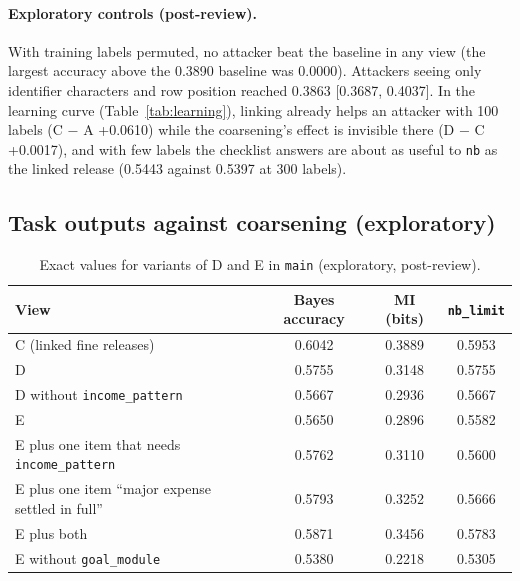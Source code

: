 \documentclass[11pt]{article}
\newcommand{\code}[1]{\texttt{#1}}
\begin{document}
\paragraph{Exploratory controls (post-review).} With training labels permuted, no attacker beat the baseline in any view (the largest accuracy above the 0.3890 baseline was 0.0000). Attackers seeing only identifier characters and row position reached 0.3863 [0.3687, 0.4037]. In the learning curve (Table~\ref{tab:learning}), linking already helps an attacker with 100 labels (C $-$ A +0.0610) while the coarsening's effect is invisible there (D $-$ C +0.0017), and with few labels the checklist answers are about as useful to \code{nb} as the linked release (0.5443 against 0.5397 at 300 labels).

\subsection{Task outputs against coarsening (exploratory)}
\label{sec:evsd}

\begin{table}[htbp]
\centering\footnotesize
\caption{Exact values for variants of D and E in \code{main} (exploratory, post-review).}
\label{tab:variants}
\begin{tabular}{@{}lccc@{}}
\toprule
View & Bayes accuracy & MI (bits) & \code{nb\_limit} \\
\midrule
C (linked fine releases) & 0.6042 & 0.3889 & 0.5953 \\
D & 0.5755 & 0.3148 & 0.5755 \\
D without \code{income\_pattern} & 0.5667 & 0.2936 & 0.5667 \\
E & 0.5650 & 0.2896 & 0.5582 \\
E plus one item that needs \code{income\_pattern} & 0.5762 & 0.3110 & 0.5600 \\
E plus one item ``major expense settled in full'' & 0.5793 & 0.3252 & 0.5666 \\
E plus both & 0.5871 & 0.3456 & 0.5783 \\
E without \code{goal\_module} & 0.5380 & 0.2218 & 0.5305 \\
\bottomrule
\end{tabular}
\end{table}
\end{document}
